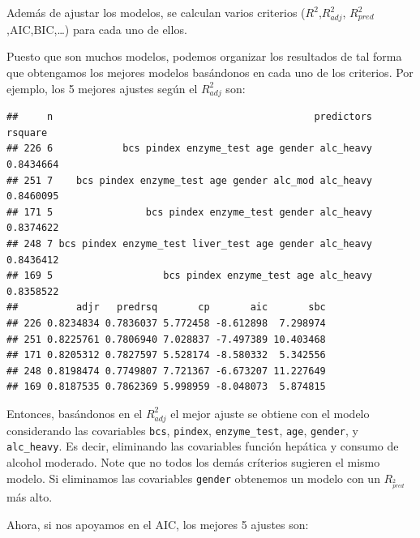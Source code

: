 \documentclass[
]{article}
\newenvironment{Shaded}{\begin{snugshade}}{\end{snugshade}}
\newcommand{\AttributeTok}[1]{\textcolor[rgb]{0.77,0.63,0.00}{#1}}
\newcommand{\DecValTok}[1]{\textcolor[rgb]{0.00,0.00,0.81}{#1}}
\newcommand{\FunctionTok}[1]{\textcolor[rgb]{0.00,0.00,0.00}{#1}}
\newcommand{\NormalTok}[1]{#1}
\newcommand{\OtherTok}[1]{\textcolor[rgb]{0.56,0.35,0.01}{#1}}
\newcommand{\SpecialCharTok}[1]{\textcolor[rgb]{0.00,0.00,0.00}{#1}}
\begin{document}
Además de ajustar los modelos, se calculan varios criterios (\(R^{2}\),\(R^{2}_{adj}\), \(R^{2}_{pred}\),AIC,BIC,\ldots) para cada uno de ellos.

Puesto que son muchos modelos, podemos organizar los resultados de tal forma que obtengamos los mejores modelos basándonos en cada uno de los criterios. Por ejemplo, los 5 mejores ajustes según el \(R^{2}_{adj}\) son:

\begin{Shaded}
\end{Shaded}

\begin{verbatim}
##     n                                             predictors   rsquare
## 226 6            bcs pindex enzyme_test age gender alc_heavy 0.8434664
## 251 7    bcs pindex enzyme_test age gender alc_mod alc_heavy 0.8460095
## 171 5                bcs pindex enzyme_test gender alc_heavy 0.8374622
## 248 7 bcs pindex enzyme_test liver_test age gender alc_heavy 0.8436412
## 169 5                   bcs pindex enzyme_test age alc_heavy 0.8358522
##          adjr   predrsq       cp       aic       sbc
## 226 0.8234834 0.7836037 5.772458 -8.612898  7.298974
## 251 0.8225761 0.7806940 7.028837 -7.497389 10.403468
## 171 0.8205312 0.7827597 5.528174 -8.580332  5.342556
## 248 0.8198474 0.7749807 7.721367 -6.673207 11.227649
## 169 0.8187535 0.7862369 5.998959 -8.048073  5.874815
\end{verbatim}

Entonces, basándonos en el \(R^{2}_{adj}\) el mejor ajuste se obtiene con el modelo considerando las covariables \texttt{bcs}, \texttt{pindex}, \texttt{enzyme\_test}, \texttt{age}, \texttt{gender}, y \texttt{alc\_heavy}. Es decir, eliminando las covariables función hepática y consumo de alcohol moderado. Note que no todos los demás críterios sugieren el mismo modelo. Si eliminamos las covariables \texttt{gender} obtenemos un modelo con un \(R_^{2}_{pred}\) más alto.

Ahora, si nos apoyamos en el AIC, los mejores 5 ajustes son:
\end{document}
